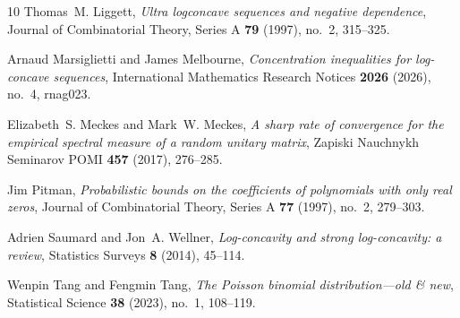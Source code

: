 \documentclass[ECP]{ejpecp}
\begin{document}
\begin{thebibliography}{10}
Thomas~M. Liggett, \emph{Ultra logconcave sequences and negative dependence},
  Journal of Combinatorial Theory, Series A \textbf{79} (1997), no.~2,
  315--325. 

Arnaud Marsiglietti and James Melbourne, \emph{Concentration inequalities for
  log-concave sequences}, International Mathematics Research Notices
  \textbf{2026} (2026), no.~4, rnag023. 

Elizabeth~S. Meckes and Mark~W. Meckes, \emph{A sharp rate of convergence for
  the empirical spectral measure of a random unitary matrix}, Zapiski Nauchnykh
  Seminarov POMI \textbf{457} (2017), 276--285. 

Jim Pitman, \emph{Probabilistic bounds on the coefficients of polynomials with
  only real zeros}, Journal of Combinatorial Theory, Series A \textbf{77}
  (1997), no.~2, 279--303. 

Adrien Saumard and Jon~A. Wellner, \emph{Log-concavity and strong
  log-concavity: a review}, Statistics Surveys \textbf{8} (2014), 45--114.

Wenpin Tang and Fengmin Tang, \emph{The {Poisson} binomial distribution---old
  \& new}, Statistical Science \textbf{38} (2023), no.~1, 108--119.

\end{thebibliography}
\end{document}

